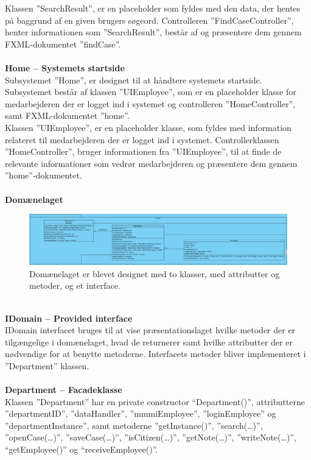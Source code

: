 Klassen ”SearchResult”, er en placeholder som fyldes med den data, der hentes på baggrund af en given brugers søgeord. Controlleren ”FindCaseController”, henter informationen som ”SearchResult”, består af og præsentere dem gennem FXML-dokumentet ”findCase”.\\\\
\textbf{Home – Systemets startside} \\
Subsystemet ”Home”, er designet til at håndtere systemets startside. Subsystemet består af klassen ”UIEmployee”, som er en placeholder klasse for medarbejderen der er logget ind i systemet og controlleren ”HomeController”, samt FXML-dokumentet ”home”.\\
Klassen ”UIEmployee”, er en placeholder klasse, som fyldes med information relateret til medarbejderen der er logget ind i systemet. Controllerklassen ”HomeController”, bruger informationen fra ”UIEmployee”, til at finde de relevante informationer som vedrør medarbejderen og præsentere dem gennem ”home”-dokumentet.\\\\
\textbf{Domænelaget}
\begin{figure}[htb!]
  \includegraphics[width = \linewidth]{./PNG/design/domaeneOpdateretKlassediagram.PNG} 
  \caption{Domænelaget er blevet designet med to klasser, med attributter og metoder, og et interface.}
  \label{fig:2dom}
\end{figure}
\\\textbf{IDomain – Provided interface}\\
IDomain interfacet bruges til at vise præsentationslaget hvilke metoder der er tilgængelige i domænelaget, hvad de returnerer samt hvilke attributter der er nødvendige for at benytte metoderne. Interfacets metoder bliver implementeret i ”Department” klassen.\\\\
\textbf{Department – Facadeklasse}\\
Klassen ”Department” har en private constructor “Department()”, attributterne ”departmentID”, ”dataHandler”, ”mmmiEmployee”, ”loginEmployee” og ”departmentInstance”, samt metoderne ”getInstance()”, ”search(…)”, ”openCase(…)”, ”saveCase(…)”, ”isCitizen(…)”, ”getNote(…)”, ”writeNote(…)”, “getEmployee()” og “receiveEmployee()”.\\
